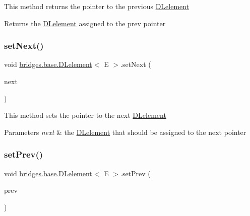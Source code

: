 This method returns the pointer to the previous \hyperlink{classbridges_1_1base_1_1_d_lelement}{D\+Lelement}

\begin{DoxyReturn}{Returns}
the \hyperlink{classbridges_1_1base_1_1_d_lelement}{D\+Lelement} assigned to the prev pointer 
\end{DoxyReturn}
\hypertarget{classbridges_1_1base_1_1_d_lelement_a1dfea3f7b47901d539aefcba2cd900d9}{}\label{classbridges_1_1base_1_1_d_lelement_a1dfea3f7b47901d539aefcba2cd900d9} 
\subsubsection{\texorpdfstring{set\+Next()}{setNext()}}
{\footnotesize\ttfamily void \hyperlink{classbridges_1_1base_1_1_d_lelement}{bridges.\+base.\+D\+Lelement}$<$ E $>$.set\+Next (\begin{DoxyParamCaption}\item[{\hyperlink{classbridges_1_1base_1_1_d_lelement}{D\+Lelement}$<$ E $>$}]{next }\end{DoxyParamCaption})}

This method sets the pointer to the next \hyperlink{classbridges_1_1base_1_1_d_lelement}{D\+Lelement}


\begin{DoxyParams}{Parameters}
{\em next} & the \hyperlink{classbridges_1_1base_1_1_d_lelement}{D\+Lelement} that should be assigned to the next pointer \\
\hline
\end{DoxyParams}
\hypertarget{classbridges_1_1base_1_1_d_lelement_a60b1f5bdaf33ad1dfcc493ebc51939d1}{}\label{classbridges_1_1base_1_1_d_lelement_a60b1f5bdaf33ad1dfcc493ebc51939d1} 
\subsubsection{\texorpdfstring{set\+Prev()}{setPrev()}}
{\footnotesize\ttfamily void \hyperlink{classbridges_1_1base_1_1_d_lelement}{bridges.\+base.\+D\+Lelement}$<$ E $>$.set\+Prev (\begin{DoxyParamCaption}\item[{\hyperlink{classbridges_1_1base_1_1_d_lelement}{D\+Lelement}$<$ E $>$}]{prev }\end{DoxyParamCaption})}

